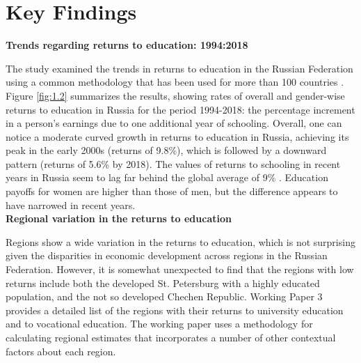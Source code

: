 \documentclass[alpha-refs]{wiley-article-04t}
\begin{document}
\section{Key Findings}


\textbf{Trends regarding returns to education: 1994:2018}

\vspace{1em}

The study examined the trends in returns to education in the Russian 
Federation using a common methodology that has been used for more than 100 
countries \parencite{Montenegro_Patrinos2014,Psacharopoulos_Patrinos2018}. 
Figure \ref{fig:1.2} summarizes the results, showing rates of overall and 
gender-wise returns to education in Russia for the period 1994-2018: the 
percentage increment in a person's earnings due to one additional year of 
schooling. Overall, one can notice a moderate curved growth in returns to 
education in Russia, achieving its peak in the early 2000s (returns of 
9.8\%), which is followed by a downward pattern (returns of 5.6\% by 2018). 
The values of returns to schooling in recent years in Russia seem to lag 
far behind the global average of 9\% 
\parencite{Psacharopoulos_Patrinos2018}. Education payoffs for women are 
higher than those of men, but the difference appears to have narrowed in 
recent years.\\  


\hspace{-1.75em} \textbf{Regional variation in the returns to 
education}

\vspace{1em}

Regions show a wide variation in the returns to education, which is not 
surprising given the disparities in economic development across regions in 
the Russian Federation.  However, it is somewhat unexpected to find  that 
the regions with low  returns include both the developed St. Petersburg 
with a highly educated population, and the not so developed Chechen 
Republic. Working Paper 3 provides a detailed list of the regions with 
their returns to university  education and to vocational education.  
The working paper uses a methodology for calculating regional estimates 
that incorporates a number of other contextual factors about each region.
\end{document}
